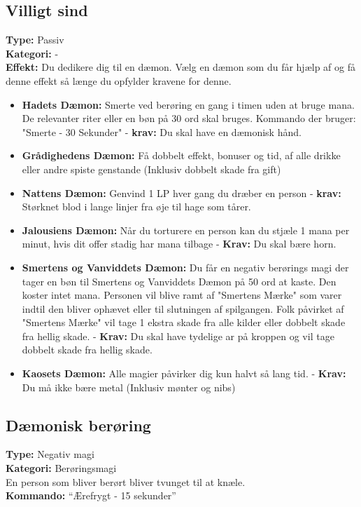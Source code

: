 \subsection{Villigt sind}
\textbf{Type:} Passiv\\
\textbf{Kategori:} -\\
    \textbf{Effekt:} Du dedikere dig til en dæmon. Vælg en dæmon som du får hjælp af og få denne effekt så længe du opfylder kravene for denne.
        \begin{itemize}
            \item \textbf{Hadets Dæmon:} Smerte ved berøring en gang i timen uden at bruge mana. De relevanter riter eller en bøn på 30 ord skal bruges. Kommando der bruger: "Smerte - 30 Sekunder" - \textbf{krav:} Du skal have en dæmonisk hånd.
            \item \textbf{Grådighedens Dæmon:} Få dobbelt effekt, bonuser og tid, af alle drikke eller andre spiste genstande (Inklusiv dobbelt skade fra gift)
            \item \textbf{Nattens Dæmon:} Genvind 1 LP hver gang du dræber en person - \textbf{krav:} Størknet blod i lange linjer fra øje til hage som tårer.
            \item \textbf{Jalousiens Dæmon:} Når du torturere en person kan du stjæle 1 mana per minut, hvis dit offer stadig har mana tilbage - \textbf{Krav:} Du skal bære horn.
            \item \textbf{Smertens og Vanviddets Dæmon:} Du får en negativ berørings magi der tager en bøn til Smertens og Vanviddets Dæmon på 50 ord at kaste. Den koster intet mana. Personen vil blive ramt af "Smertens Mærke" som varer indtil den bliver ophævet eller til slutningen af spilgangen. Folk påvirket af "Smertens Mærke" vil tage 1 ekstra skade fra alle kilder eller dobbelt skade fra hellig skade. - \textbf{Krav:} Du skal have tydelige ar på kroppen og vil tage dobbelt skade fra hellig skade.
            \item \textbf{Kaosets Dæmon:} Alle magier påvirker dig kun halvt så lang tid. - \textbf{Krav:} Du må ikke bære metal (Inklusiv mønter og nibs)
        \end{itemize}

\subsection{Dæmonisk berøring}
\textbf{Type:} Negativ magi\\
\textbf{Kategori:} Berøringsmagi\\
En person som bliver berørt bliver tvunget til at knæle.\\
\textbf{Kommando:} “Ærefrygt - 15 sekunder”

